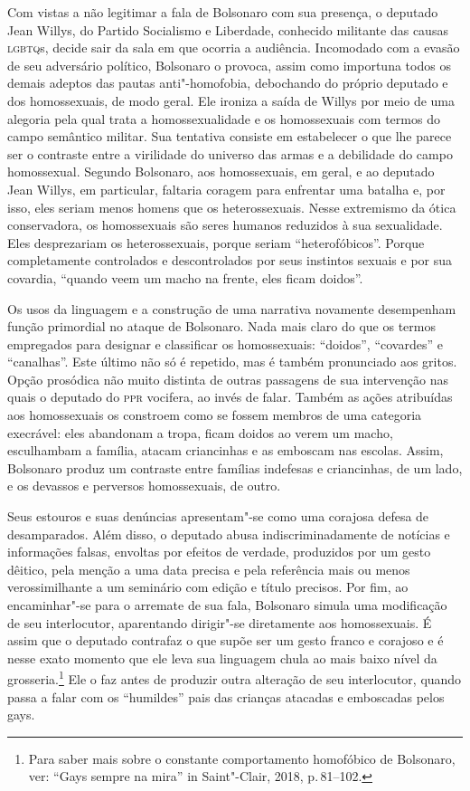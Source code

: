 Com vistas a não legitimar a fala de Bolsonaro com sua presença, o
deputado Jean Willys, do Partido Socialismo e Liberdade, conhecido
militante das causas \textsc{lgbtq}s, decide sair da sala em que ocorria a
audiência. Incomodado com a evasão de seu adversário político, Bolsonaro
o provoca, assim como importuna todos os demais adeptos das pautas
anti"-homofobia, debochando do próprio deputado e dos homossexuais, de
modo geral. Ele ironiza a saída de Willys por meio de uma alegoria pela
qual trata a homossexualidade e os homossexuais com termos do campo
semântico militar. Sua tentativa consiste em estabelecer o que lhe
parece ser o contraste entre a virilidade do universo das armas e a
debilidade do campo homossexual. Segundo Bolsonaro, aos homossexuais, em
geral, e ao deputado Jean Willys, em particular, faltaria coragem para
enfrentar uma batalha e, por isso, eles seriam menos homens que os
heterossexuais. Nesse extremismo da ótica conservadora, os homossexuais
são seres humanos reduzidos à sua sexualidade. Eles desprezariam os
heterossexuais, porque seriam ``heterofóbicos''. Porque completamente
controlados e descontrolados por seus instintos sexuais e por sua
covardia, ``quando veem um macho na frente, eles ficam doidos''.

Os usos da linguagem e a construção de uma narrativa novamente
desempenham função primordial no ataque de Bolsonaro. Nada mais claro do
que os termos empregados para designar e classificar os homossexuais:
``doidos'', ``covardes'' e ``canalhas''. Este último não só é repetido,
mas é também pronunciado aos gritos. Opção prosódica não muito distinta
de outras passagens de sua intervenção nas quais o deputado do \textsc{ppr}
vocifera, ao invés de falar. Também as ações atribuídas aos homossexuais
os constroem como se fossem membros de uma categoria execrável: eles
abandonam a tropa, ficam doidos ao verem um macho, esculhambam a
família, atacam criancinhas e as emboscam nas escolas. Assim, Bolsonaro
produz um contraste entre famílias indefesas e criancinhas, de um lado,
e os devassos e perversos homossexuais, de outro.

Seus estouros e suas denúncias apresentam"-se como uma corajosa defesa de
desamparados. Além disso, o deputado abusa indiscriminadamente de
notícias e informações falsas, envoltas por efeitos de verdade,
produzidos por um gesto dêitico, pela menção a uma data precisa e pela
referência mais ou menos verossimilhante a um seminário com edição e
título precisos. Por fim, ao encaminhar"-se para o arremate de sua fala,
Bolsonaro simula uma modificação de seu interlocutor, aparentando
dirigir"-se diretamente aos homossexuais. É assim que o deputado
contrafaz o que supõe ser um gesto franco e corajoso e é nesse exato
momento que ele leva sua linguagem chula ao mais baixo nível da
grosseria.\footnote{Para saber mais sobre o constante comportamento
  homofóbico de Bolsonaro, ver: ``Gays sempre na mira'' in Saint"-Clair,
  2018, p.\,81--102.} Ele o faz antes de produzir outra alteração de seu
interlocutor, quando passa a falar com os ``humildes'' pais das crianças
atacadas e emboscadas pelos gays.

